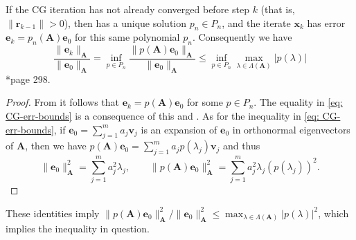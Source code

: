 \begin{thm} \label{theorem: CG-convg}
    If the CG iteration has not already converged before step $k$ (that is, $\| \bm{r}_{k-1} \| > 0 $), then  has a unique solution $p_n \in P_n$, and the iterate $\bm{x}_{k}$ has error $\bm{e}_k = p_n \left( \bm{A} \right) \bm{e}_{0}$ for this same polynomial $p_n$. Consequently we have
    \begin{equation} \label{eq: CG-err-bounds}
        \frac{\| \bm{e}_k \|_{\bm{A}}}{\| \bm{e}_{0} \|_{\bm{A}}} = \inf_{p \in P_n} \frac{\| p \left( \bm{A} \right) \bm{e}_{0} \|_{\bm{A}}}{\| \bm{e}_{0} \|_{\bm{A}}} \leq \inf_{p \in P_n} \max_{\lambda \in \Lambda \left( \bm{A} \right)} \left| p (\lambda) \right|
    \end{equation}
    \cite{TrefethenLloydN.LloydNicholas1997Nla/}*{page 298}.
\end{thm}

\begin{proof}
    From  it follows that $\bm{e}_{k} = p \left( \bm{A} \right) \bm{e}_{0}$ for some $p \in P_n$. The equality in \ref{eq: CG-err-bounds} is a consequence of this and . As for the inequality in \ref{eq: CG-err-bounds}, if $\bm{e}_{0} = \sum_{j=1}^{m} a_j \bm{v}_j$ is an expansion of $\bm{e}_{0}$ in orthonormal eigenvectors of $\bm{A}$, then we have $p \left( \bm{A} \right) \bm{e}_{0} = \sum_{j=1}^{m} a_j p \left( \lambda_j \right) \bm{v}_{j}$ and thus
    \[
        \| \bm{e}_{0} \|_{\bm{A}}^{2} = \sum_{j=1}^{m} a_{j}^{2} \lambda_j, \qquad \| p \left( \bm{A} \right) \bm{e}_0 \|_{\bm{A}}^{2} = \sum_{j=1}^{m} a_{j}^{2} \lambda_j \left( p \left( \lambda_j \right) \right)^{2}.
    \]
\end{proof}
These identities imply $\| p \left( \bm{A} \right) \bm{e}_{0} \|_{\bm{A}}^{2} / \| \bm{e}_{0} \|_{\bm{A}}^{2} \leq \max_{\lambda \in \Lambda \left( \bm{A} \right)} \left| p (\lambda) \right|^{2}$, which implies the inequality in question.
